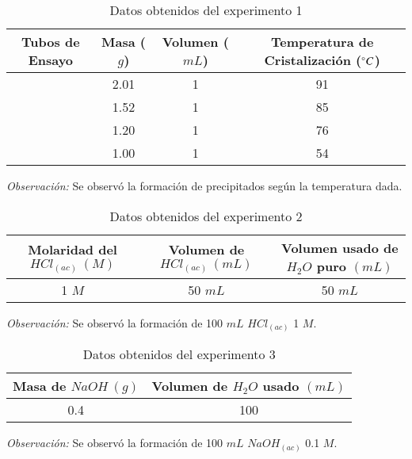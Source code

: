 \documentclass[../main.tex]{subfiles}
\begin{document}
\begin{table}[H]
    \centering
    \begin{tabular}{c|c|c|c}
        \hline
        Tubos de Ensayo & Masa ($g$) & Volumen ($mL$) & Temperatura de Cristalización ($\degree C$) \\
        \hline
        #1    &  2.01      &   1    &  91  \\
        #2    &  1.52      &   1    &  85  \\
        #3    &  1.20      &   1    &  76  \\
        #4    &  1.00      &   1    &  54  \\
        \hline
    \end{tabular}
    \label{tab:exp1}
    \caption{Datos obtenidos del experimento 1}
\end{table}
\textit{Observación: } Se observó la formación de precipitados según la temperatura dada.

\begin{table}[H]
    \centering
    \begin{tabular}{c|c|c}
        \hline
        Molaridad del $HCl_{(ac)}\:(M)$ & Volumen de $HCl_{(ac)}\:(mL)$ & Volumen usado de $H_2O$ puro $(mL)$\\
        \hline
        1 $M$ & 50 $mL$ & 50 $mL$ \\ 
        \hline
    \end{tabular}
    \label{tab:exp2}
    \caption{Datos obtenidos del experimento 2}
\end{table}
\textit{Observación: } Se observó la formación de 100 $mL$ $HCl_{(ac)}$ 1 $M$.

\begin{table}[H]
    \centering
    \begin{tabular}{c|c}
        \hline
        Masa de $NaOH \:(g)$ & Volumen de $H_2O$ usado $(mL)$\\
        \hline
        0.4     &   100 \\
        \hline
    \end{tabular}
    \label{tab:exp3}
    \caption{Datos obtenidos del experimento 3}
\end{table}
\textit{Observación: } Se observó la formación de 100 $mL$ $NaOH_{(ac)}$ 0.1 $M$.
\end{document}
